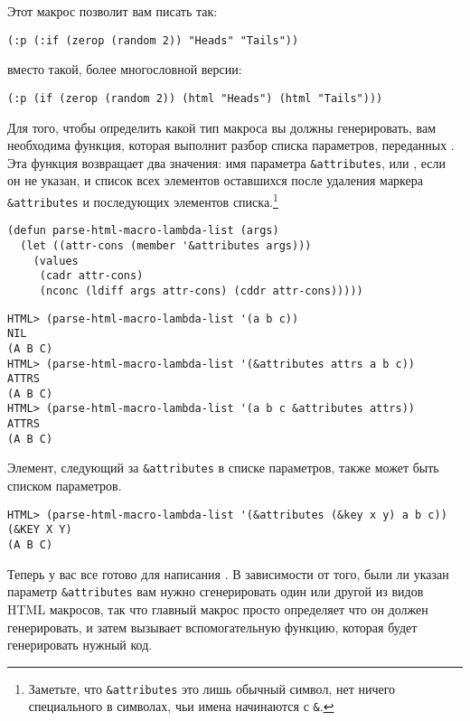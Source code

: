 Этот макрос позволит вам писать так:

\begin{lstlisting}
(:p (:if (zerop (random 2)) "Heads" "Tails"))
\end{lstlisting}

вместо такой, более многословной версии:

\begin{lstlisting}
(:p (if (zerop (random 2)) (html "Heads") (html "Tails")))
\end{lstlisting}

Для того, чтобы определить какой тип макроса вы должны генерировать, вам необходима
функция, которая выполнит разбор списка параметров, переданных .
Эта функция возвращает два значения: имя параметра \lstinline!&attributes!, или
, если он не указан, и список всех элементов  оставшихся после
удаления маркера \lstinline!&attributes! и последующих элементов
списка.\footnote{Заметьте, что \lstinline!&attributes! это лишь обычный символ, нет ничего
  специального в символах, чьи имена начинаются с \lstinline!&!.}

\begin{lstlisting}
(defun parse-html-macro-lambda-list (args)
  (let ((attr-cons (member '&attributes args)))
    (values 
     (cadr attr-cons)
     (nconc (ldiff args attr-cons) (cddr attr-cons)))))
\end{lstlisting}

\begin{lstlisting}
HTML> (parse-html-macro-lambda-list '(a b c))
NIL
(A B C)
HTML> (parse-html-macro-lambda-list '(&attributes attrs a b c))
ATTRS
(A B C)
HTML> (parse-html-macro-lambda-list '(a b c &attributes attrs))
ATTRS
(A B C)
\end{lstlisting}

Элемент, следующий за \lstinline!&attributes! в списке параметров, также может быть
списком параметров.

\begin{lstlisting}
HTML> (parse-html-macro-lambda-list '(&attributes (&key x y) a b c))
(&KEY X Y)
(A B C)
\end{lstlisting}

Теперь у вас все готово для написания .  В зависимости от того,
были ли указан параметр \lstinline!&attributes! вам нужно сгенерировать один или другой из
видов HTML макросов, так что главный макрос просто определяет что он должен генерировать,
и затем вызывает вспомогательную функцию, которая будет генерировать нужный код.

